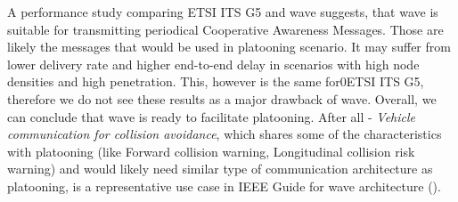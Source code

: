 A performance study comparing \acrshort{ETSI} ITS G5 and \acrshort{wave} \cite{Eckhoff2013AWAVE} suggests, that \acrshort{wave} is suitable for transmitting periodical Cooperative Awareness Messages. Those are likely the messages that would be used in platooning scenario. It may suffer from lower delivery rate and higher end-to-end delay in scenarios with high node densities and high penetration. This, however is the same for0\acrshort{ETSI} ITS G5, therefore we do not see these results as a major drawback of \acrshort{wave}. Overall, we can conclude that \acrshort{wave} is ready to facilitate platooning. After all - \emph{Vehicle communication for collision avoidance}, which shares some of the characteristics with platooning (like Forward collision warning, Longitudinal collision risk warning) and would likely need similar type of communication architecture as platooning, is a representative use case in \acrshort{IEEE} Guide for \acrshort{wave} architecture (\cite{VehicularTechnologySociety2014IEEEArchitecture}).